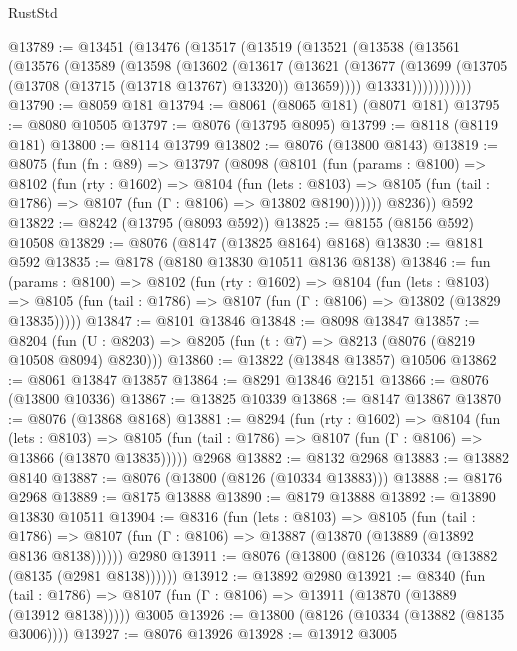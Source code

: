 \begin{lexlean}{RustStd}
\begin{coremodule}
@13789 := @13451
    (@13476
      (@13517
        (@13519
          (@13521
            (@13538
              (@13561
                (@13576
                  (@13589
                    (@13598
                      (@13602
                        (@13617
                          (@13621
                            (@13677
                              (@13699 (@13705 (@13708 (@13715 (@13718 @13767) @13320)) @13659))))
                          @13331)))))))))))
@13790 := @8059 @181
@13794 := @8061 (@8065 @181) (@8071 @181)
@13795 := @8080 @10505
@13797 := @8076 (@13795 @8095)
@13799 := @8118 (@8119 @181)
@13800 := @8114 @13799
@13802 := @8076 (@13800 @8143)
@13819 := @8075
    (fun (fn : @89) =>
    @13797
      (@8098
        (@8101
          (fun (params : @8100) =>
          @8102
            (fun (rty : @1602) =>
            @8104
              (fun (lets : @8103) =>
              @8105 (fun (tail : @1786) => @8107 (fun (Γ : @8106) => @13802 @8190))))))
        @8236))
    @592
@13822 := @8242 (@13795 (@8093 @592))
@13825 := @8155 (@8156 @592) @10508
@13829 := @8076 (@8147 (@13825 @8164) @8168)
@13830 := @8181 @592
@13835 := @8178 (@8180 @13830 @10511 @8136 @8138)
@13846 := fun (params : @8100) =>
  @8102
    (fun (rty : @1602) =>
    @8104
      (fun (lets : @8103) =>
      @8105 (fun (tail : @1786) => @8107 (fun (Γ : @8106) => @13802 (@13829 @13835)))))
@13847 := @8101 @13846
@13848 := @8098 @13847
@13857 := @8204
    (fun (U : @8203) => @8205 (fun (t : @7) => @8213 (@8076 (@8219 @10508 @8094) @8230)))
@13860 := @13822 (@13848 @13857) @10506
@13862 := @8061 @13847 @13857
@13864 := @8291 @13846 @2151
@13866 := @8076 (@13800 @10336)
@13867 := @13825 @10339
@13868 := @8147 @13867
@13870 := @8076 (@13868 @8168)
@13881 := @8294
    (fun (rty : @1602) =>
    @8104
      (fun (lets : @8103) =>
      @8105 (fun (tail : @1786) => @8107 (fun (Γ : @8106) => @13866 (@13870 @13835)))))
    @2968
@13882 := @8132 @2968
@13883 := @13882 @8140
@13887 := @8076 (@13800 (@8126 (@10334 @13883)))
@13888 := @8176 @2968
@13889 := @8175 @13888
@13890 := @8179 @13888
@13892 := @13890 @13830 @10511
@13904 := @8316
    (fun (lets : @8103) =>
    @8105
      (fun (tail : @1786) =>
      @8107 (fun (Γ : @8106) => @13887 (@13870 (@13889 (@13892 @8136 @8138))))))
    @2980
@13911 := @8076 (@13800 (@8126 (@10334 (@13882 (@8135 (@2981 @8138))))))
@13912 := @13892 @2980
@13921 := @8340
    (fun (tail : @1786) => @8107 (fun (Γ : @8106) => @13911 (@13870 (@13889 (@13912 @8138)))))
    @3005
@13926 := @13800 (@8126 (@10334 (@13882 (@8135 @3006))))
@13927 := @8076 @13926
@13928 := @13912 @3005

\end{coremodule}
\end{lexlean}
